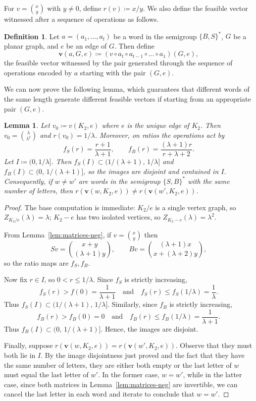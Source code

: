 \documentclass[A4paper,reqno,oneside,12pt]{amsart}
\theoremstyle{plain}
\newtheorem{lemma}[theorem]{Lemma}
\theoremstyle{definition}
\newtheorem{definition}[theorem]{Definition}
\begin{document}
For $v=\binom{x}{y}$ with $y \neq 0$, define $r(v)\coloneqq x/y$. We also define the feasible vector witnessed after a sequence of operations as follows.
\begin{definition}\label{def:feasible_generated}
 Let $a = (a_1,\dots,a_t)$ be a word in the semigroup $\{B,S\}^\ast$, $G$ be a planar graph, and $e$ be an edge of $G$. Then define 
     \[\mathbf{v}(a,G,e) \coloneqq (v\circ a_t\circ a_{t-1}\circ\dots\circ a_1)(G,e),\]
     the feasible vector witnessed by the pair generated through the sequence of operations encoded by $a$ starting with the pair $(G,e)$.
\end{definition}
We can now prove the following lemma, which guarantees that different words of the same length generate different feasible vectors if starting from an appropriate pair $(G,e)$.
\begin{lemma}\label{lem:pingpong-neg}
Let $v_0\coloneqq v(K_2,e)$ where $e$ is the unique edge of $K_2$.
Then $v_0=\binom{\lambda}{\lambda^2}$ and $r(v_0)=1/\lambda$.
Moreover, on ratios the operations act by
\[
f_S(r)=\frac{r+1}{\lambda+1},
\qquad
f_B(r)=\frac{(\lambda+1)r}{r+\lambda+2}.
\]
Let $I\coloneqq (0,1/\lambda]$. Then $f_S(I)\subset\bigl(1/(\lambda+1),\,1/\lambda\bigr]$ and $f_B(I)\subset\bigl(0,\,1/(\lambda+1)\bigr]$,
so the images are disjoint and contained in $I$.
Consequently, if $w\neq w'$ are words in the semigroup $\{S,B\}^\ast$ with the same number of letters, then $r(\mathbf{v}(w,K_2,e))\neq r(\mathbf{v}(w',K_2,e))$.
\end{lemma}

\begin{proof}
The base computation is immediate: $K_2/e$ is a single vertex graph, so $Z_{K_2/e}(\lambda)=\lambda$; $K_2-e$ has two isolated vertices, so $Z_{K_2-e}(\lambda)=\lambda^2$.

From Lemma~\ref{lem:matrices-neg}, if $v=\binom{x}{y}$ then
\[
Sv=\binom{x+y}{(\lambda+1)y},\qquad Bv=\binom{(\lambda+1)x}{x+(\lambda+2)y},
\]
so the ratio maps are $f_S,f_B$.

Now fix $r\in I$, so $0<r\le 1/\lambda$. Since $f_S$ is strictly increasing,
\[
f_S(r)>f(0) =\frac{1}{\lambda+1}
\quad\text{and}\quad
f_S(r)\le f_S(1/\lambda) =\frac{1}{\lambda}.
\]
Thus $f_S(I)\subset(1/(\lambda+1),\,1/\lambda]$.
Similarly, since $f_B$ is strictly increasing,
\[
 f_B(r) > f_B(0) = 0\quad\text{and}\quad f_B(r)\le f_B(1/\lambda)=\frac{1}{\lambda+1}.
\]
Thus $f_B(I)\subset(0,\,1/(\lambda+1)]$.
Hence, the images are disjoint.

Finally, suppose $r(\mathbf{v}(w,K_2,e))= r(\mathbf{v}(w',K_2,e))$.
Observe that they must both lie in $I$.
By the image 
disjointness just proved and the fact that they have the same number of letters, they are either both empty or the last letter of $w$ must equal the last letter of $w'$. In the former case, $w=w'$, while in the latter case, since both matrices in Lemma~\ref{lem:matrices-neg} are invertible, we can cancel the last letter in each word and iterate to conclude that $w=w'$.
\end{proof}
\end{document}
